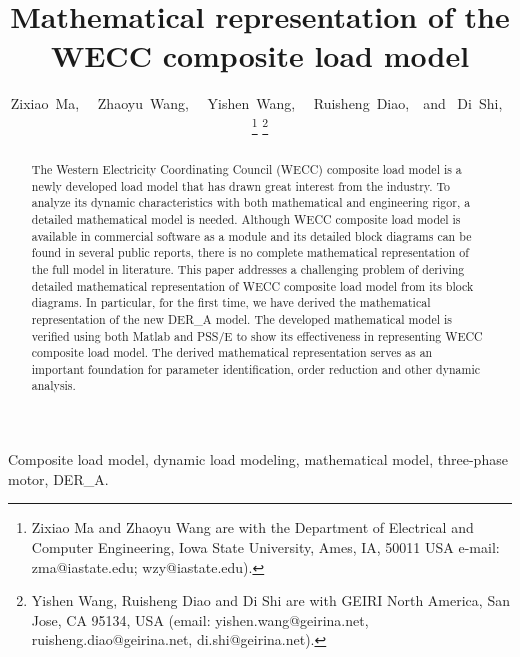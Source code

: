 \documentclass[journal]{IEEEtran}
\begin{document}
	
	\title{Mathematical representation of the WECC composite load model}
	
	
	
\author{Zixiao~Ma,~~
	Zhaoyu~Wang,~~
	Yishen~Wang,~~
	Ruisheng~Diao,~~and~
	Di~Shi,~%
	\thanks{Zixiao Ma and Zhaoyu Wang are with the Department of Electrical and Computer Engineering, Iowa State University, Ames, IA, 50011 USA e-mail: zma@iastate.edu; wzy@iastate.edu).}
	\thanks{Yishen Wang, Ruisheng Diao and Di Shi are with GEIRI North America, San Jose, CA 95134, USA (email: yishen.wang@geirina.net, ruisheng.diao@geirina.net, di.shi@geirina.net).}%
	
}
	
	
	
	\maketitle
	
	\begin{abstract}
		The Western Electricity Coordinating Council (WECC) composite load model is a newly developed load model that has drawn great interest from the industry. To analyze its dynamic characteristics with both mathematical and engineering rigor, a detailed mathematical model is needed. Although WECC composite load model is available in commercial software as a module and its detailed block diagrams can be found in several public reports, there is no complete mathematical representation of the full model in literature. This paper addresses a challenging problem of deriving detailed mathematical representation of WECC composite load model from its block diagrams. In particular, for the first time, we have derived the mathematical representation of the new DER\_A model. The developed mathematical model is verified using both Matlab and PSS/E to show its effectiveness in representing WECC composite load model. The derived mathematical representation serves as an important foundation for parameter identification, order reduction and other dynamic analysis. 
	\end{abstract}
	\begin{IEEEkeywords}
		Composite load model, dynamic load modeling, mathematical model, three-phase motor, DER\_A.
	\end{IEEEkeywords}
\end{document}
